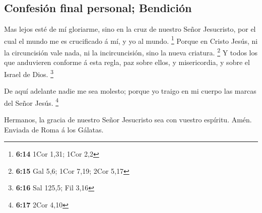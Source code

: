 \hypertarget{confesiuxf3n-final-personal-bendiciuxf3n}{%
\subsection{Confesión final personal;
Bendición}\label{confesiuxf3n-final-personal-bendiciuxf3n}}

 Mas lejos esté de mí gloriarme, sino en la cruz de
nuestro Señor Jesucristo, por el cual el mundo me es crucificado á mí, y
yo al mundo. \footnote{\textbf{6:14} 1Cor 1,31; 1Cor 2,2}
 Porque en Cristo Jesús, ni la circuncisión vale nada, ni
la incircuncisión, sino la nueva criatura. \footnote{\textbf{6:15} Gal
  5,6; 1Cor 7,19; 2Cor 5,17}  Y todos los que anduvieren
conforme á esta regla, paz sobre ellos, y misericordia, y sobre el
Israel de Dios. \footnote{\textbf{6:16} Sal 125,5; Fil 3,16}

 De aquí adelante nadie me sea molesto; porque yo traigo
en mi cuerpo las marcas del Señor Jesús. \footnote{\textbf{6:17} 2Cor
  4,10}

 Hermanos, la gracia de nuestro Señor Jesucristo sea con
vuestro espíritu. Amén. Enviada de Roma á los Gálatas.
